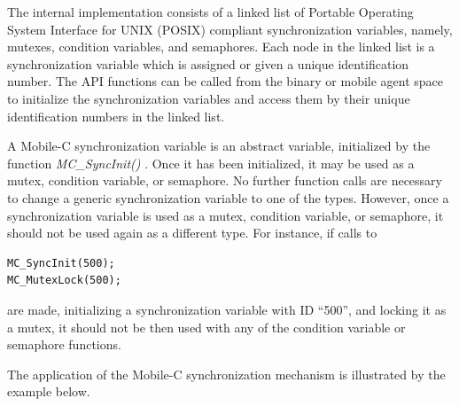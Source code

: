 \documentclass[11pt]{report}
\begin{document}
The internal implementation consists of a linked list of 
Portable Operating System Interface for UNIX (POSIX) compliant synchronization 
variables, namely, mutexes, condition variables, and semaphores. 
Each node in the linked list is a synchronization variable which is assigned 
or given a unique identification number. 
The API functions can be called from the binary or mobile agent 
space to initialize the synchronization variables and access them by their 
unique identification numbers in the linked list.

A Mobile-C synchronization variable is an abstract variable, initialized
by the function {\it MC\_SyncInit()} .
Once it has been initialized, it may be used as a mutex, condition variable, 
or semaphore.
No further function calls are necessary to change a generic synchronization
variable to one of the types. However, once a synchronization variable is
used as a mutex, condition variable, or semaphore, it should not be used again
as a different type. For instance, if calls to 
\begin{verbatim}
MC_SyncInit(500);
MC_MutexLock(500);
\end{verbatim}
are made, initializing a synchronization variable with ID ``500'', and locking
it as a mutex, it should not be then used with any of the condition variable or
semaphore functions.

The application of the Mobile-C synchronization mechanism is illustrated by 
the example below.

\noindent
\end{document}
